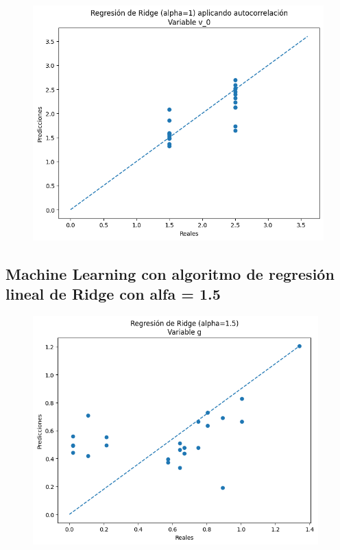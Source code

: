 \documentclass[oneside,openright,titlepage,numbers=noenddot,openany,headinclude,footinclude=true,
cleardoublepage=empty,abstractoff,BCOR=5mm,paper=a4,fontsize=12pt,main=spanish]{scrreprt}
\begin{document}
\begin{figure}[H]
	\centering
	\includegraphics[width=12cm]{Regresión de Ridge (alpha=1) aplicando autocorrelación Variable v_0.png}
\end{figure}

\subsection{Machine Learning con algoritmo de regresión lineal de Ridge con alfa = 1.5}

\begin{figure}[H]
	\centering
	\includegraphics[width=11cm]{Regresión de Ridge (alpha=1.5) Variable g.png}
\end{figure}
\end{document}
